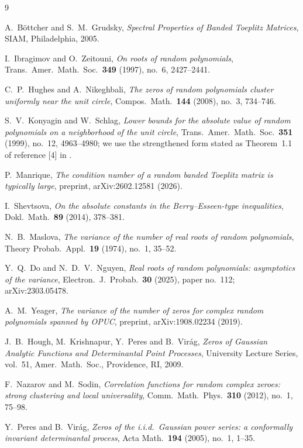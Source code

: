 \documentclass[11pt]{article}
\begin{document}
\begin{thebibliography}{9}

A.~B\"ottcher and S.~M.~Grudsky,
\emph{Spectral Properties of Banded Toeplitz Matrices},
SIAM, Philadelphia, 2005.

I.~Ibragimov and O.~Zeitouni,
\emph{On roots of random polynomials},
Trans.\ Amer.\ Math.\ Soc.\ \textbf{349} (1997), no.~6, 2427--2441.

C.~P.~Hughes and A.~Nikeghbali,
\emph{The zeros of random polynomials cluster uniformly near the unit circle},
Compos.\ Math.\ \textbf{144} (2008), no.~3, 734--746.

S.~V.~Konyagin and W.~Schlag,
\emph{Lower bounds for the absolute value of random polynomials on a
neighborhood of the unit circle},
Trans.\ Amer.\ Math.\ Soc.\ \textbf{351} (1999), no.~12, 4963--4980; we use the
strengthened form stated as Theorem~1.1 of reference [4] in \cite{Manrique}.

P.~Manrique,
\emph{The condition number of a random banded Toeplitz matrix is typically
large},
preprint, arXiv:2602.12581 (2026).

I.~Shevtsova,
\emph{On the absolute constants in the Berry--Esseen-type inequalities},
Dokl.\ Math.\ \textbf{89} (2014), 378--381.

N.~B.~Maslova,
\emph{The variance of the number of real roots of random polynomials},
Theory Probab.\ Appl.\ \textbf{19} (1974), no.~1, 35--52.

Y.~Q.~Do and N.~D.~V.~Nguyen,
\emph{Real roots of random polynomials: asymptotics of the variance},
Electron.\ J.\ Probab.\ \textbf{30} (2025), paper no.~112; arXiv:2303.05478.

A.~M.~Yeager,
\emph{The variance of the number of zeros for complex random polynomials
spanned by OPUC},
preprint, arXiv:1908.02234 (2019).

J.~B.~Hough, M.~Krishnapur, Y.~Peres and B.~Vir\'ag,
\emph{Zeros of Gaussian Analytic Functions and Determinantal Point Processes},
University Lecture Series, vol.~51, Amer.\ Math.\ Soc., Providence, RI, 2009.

F.~Nazarov and M.~Sodin,
\emph{Correlation functions for random complex zeroes: strong clustering and
local universality},
Comm.\ Math.\ Phys.\ \textbf{310} (2012), no.~1, 75--98.

Y.~Peres and B.~Vir\'ag,
\emph{Zeros of the i.i.d.\ Gaussian power series: a conformally invariant
determinantal process},
Acta Math.\ \textbf{194} (2005), no.~1, 1--35.


\end{thebibliography}
\end{document}
